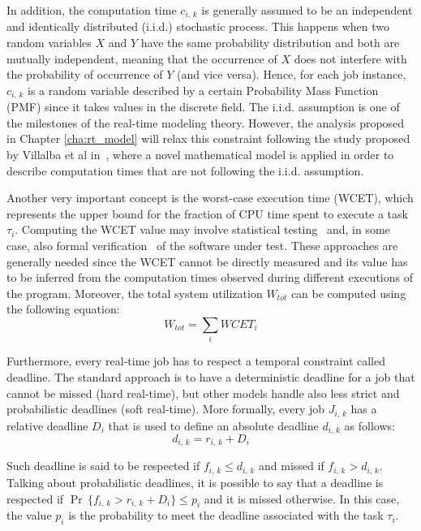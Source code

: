In addition, the computation time \( c_{i,\,k} \) is generally assumed to be an
independent and identically distributed (i.i.d.) stochastic process.
This happens when two random variables \( X \) and \( Y \) have 
the same probability distribution and both are mutually
independent, meaning that the occurrence of \( X \) does not interfere with 
the probability of occurrence of \( Y \) (and vice versa).
Hence, for each job instance, \( c_{i,\,k} \) is a random
variable described by a certain Probability Mass Function (PMF) since it
takes values in the discrete field.
The i.i.d. assumption is one of the milestones of the real-time modeling theory.
However, the analysis proposed in Chapter \ref{cha:rt_model} will relax this 
constraint following the study proposed by Villalba et al
in~\cite{villalba2017probabilistic}, where a novel mathematical model is applied
in order to describe computation times that are not following the i.i.d.
assumption.

Another very important concept is the worst-case execution time (WCET), which
represents the upper bound for the fraction of CPU time spent to execute a task
\( \tau_{i} \). Computing the WCET value may involve statistical testing~\cite{bernat2002wcet}
and, in some case, also formal verification~\cite{souyris2009formal} of the
software under test. These approaches are generally needed since the WCET cannot
be directly measured and its value has to be inferred from the computation times
observed during different executions of the program.
Moreover, the total system utilization \( W_{tot} \) can be computed using
the following equation:
\begin{equation}\label{eq:system_utilization}
    W_{tot} = \displaystyle\sum_{i} WCET_{i}
\end{equation}

Furthermore, every real-time job has to respect a temporal constraint called
deadline. The standard approach is to have a deterministic deadline for a job
that cannot be missed (hard real-time), but other models handle also
less strict and probabilistic deadlines (soft real-time).
More formally, every job \( J_{i,\,k} \) has a relative deadline \( D_{i} \) that
is used to define an absolute deadline \( d_{i,\,k} \) as follows:
\begin{equation}
    d_{i,\,k} = r_{i,\,k} + D_{i}
\end{equation}

Such deadline is said to be respected if \( f_{i,\,k} \leq d_{i,\,k} \) and missed
if \( f_{i,\,k} > d_{i,\,k} \). Talking about probabilistic deadlines, it is
possible to say that a deadline is respected if 
\( \Pr\,\{f_{i,\,k} > r_{i,\,k} + D_{i} \} \leq p_{i} \) and it is missed otherwise.
In this case, the value \( p_{i} \) is the probability to meet the deadline associated
with the task \( \tau_{i} \).



